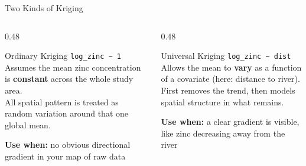 \documentclass[aspectratio=169, 12pt]{beamer}
\begin{document}
\begin{frame}{Two Kinds of Kriging}
  \begin{columns}[t]
    \begin{column}{0.48\textwidth}
      \begin{block}{Ordinary Kriging}
        \texttt{log\_zinc \textasciitilde{} 1}\\[0.5em]
        Assumes the mean zinc concentration is \textbf{constant} across the whole study area.\\[0.5em]
        All spatial pattern is treated as random variation around that one global mean.
      \end{block}
      \vspace{0.4em}
      \small\textbf{Use when:} no obvious directional gradient in your map of raw data
    \end{column}
    \begin{column}{0.48\textwidth}
      \begin{block}{Universal Kriging}
        \texttt{log\_zinc \textasciitilde{} dist}\\[0.5em]
        Allows the mean to \textbf{vary} as a function of a covariate (here: distance to river).\\[0.5em]
        First removes the trend, then models spatial structure in what remains.
      \end{block}
      \vspace{0.4em}
      \small\textbf{Use when:} a clear gradient is visible, like zinc decreasing away from the river
    \end{column}
  \end{columns}
\end{frame}
\end{document}
